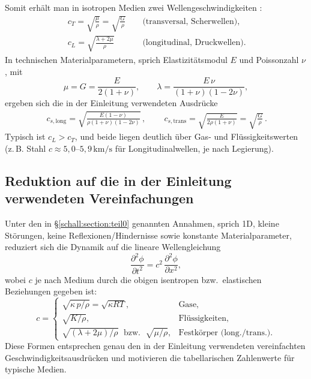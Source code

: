 Somit erhält man in isotropen Medien zwei Wellengeschwindigkeiten \cite{schall:landaulifschitz,schall:gurtin}:
\begin{align}
    \boxed{\,c_T=\sqrt{\frac{\mu}{\rho}}=\sqrt{\frac{G}{\rho}}\,} \quad &\text{(transversal, Scherwellen)},\\[2mm]
    \boxed{\,c_L=\sqrt{\frac{\lambda+2\mu}{\rho}}\,} \quad &\text{(longitudinal, Druckwellen)}.
\end{align}
In technischen Materialparametern, sprich Elastizitätsmodul $E$ und Poissonzahl $\nu$, mit
\[
    \mu=G=\frac{E}{2(1+\nu)},
    \qquad
    \lambda=\frac{E\,\nu}{(1+\nu)(1-2\nu)},
\]
ergeben sich die in der Einleitung verwendeten Ausdrücke
\begin{align}
    \boxed{\,c_{s,\mathrm{long}}
    = \sqrt{\frac{E(1-\nu)}{\rho(1+\nu)(1-2\nu)}}\,},\qquad
    \boxed{\,c_{s,\mathrm{trans}}
    = \sqrt{\frac{E}{2\rho(1+\nu)}}=\sqrt{\frac{G}{\rho}}\,}.
\end{align}
Typisch ist $c_L>c_T$, und beide liegen deutlich über Gas- und Flüssigkeitswerten (z.\,B. Stahl $c\approx 5{,}0\text{--}5{,}9\,\mathrm{km/s}$ für Longitudinalwellen, je nach Legierung).

\subsection{Reduktion auf die in der Einleitung verwendeten Vereinfachungen}
Unter den in \S\ref{schall:section:teil0} genannten Annahmen, sprich 1D, kleine Störungen, keine Reflexionen/Hindernisse sowie konstante Materialparameter, reduziert sich die Dynamik auf die lineare Wellengleichung
\[
    \frac{\partial^2 \phi}{\partial t^2}=c^2\,\frac{\partial^2 \phi}{\partial x^2},
\]
wobei $c$ je nach Medium durch die obigen isentropen bzw.\ elastischen Beziehungen gegeben ist:
\[
    c=\begin{cases}
    \sqrt{\kappa\,p/\rho}=\sqrt{\kappa R T}, & \text{Gase},\\[1mm]
    \sqrt{K/\rho}, & \text{Flüssigkeiten},\\[1mm]
    \sqrt{(\lambda+2\mu)/\rho}\;\text{ bzw. }\;\sqrt{\mu/\rho}, & \text{Festkörper (long./trans.)}.
\end{cases}
\]
Diese Formen entsprechen genau den in der Einleitung verwendeten vereinfachten Geschwindigkeitsausdrücken und motivieren die tabellarischen Zahlenwerte für typische Medien.


